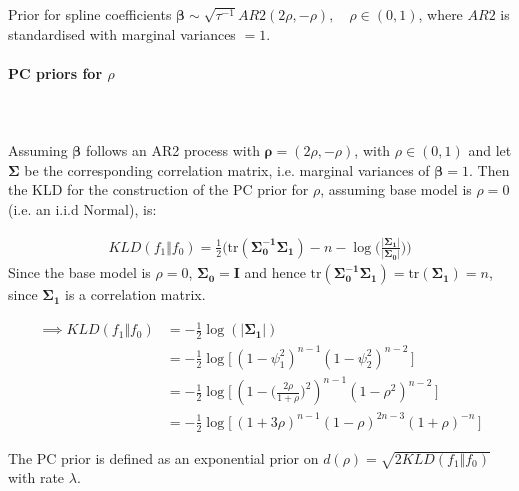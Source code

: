 \documentclass[12pt,a4paper]{article}
\date{\vspace{-5ex}}
\begin{document}
Prior for spline coefficients $\boldsymbol{\beta} \sim \sqrt{\tau^{-1}} AR2(2\rho, -\rho), \quad \rho \in (0, 1)$, where $AR2$ is standardised with marginal variances $= 1.$

\paragraph{PC priors for $\rho$} \\~\\

Assuming $\boldsymbol{\beta}$ follows an AR2 process with $\boldsymbol{\rho} = (2\rho, -\rho)$, with $\rho \in (0, 1)$ and let $\boldsymbol{\Sigma}$ be the corresponding correlation matrix, i.e. marginal variances of $\boldsymbol{\beta} = 1$. Then the KLD for the construction of the PC prior for $\rho$, assuming base model is $\rho = 0$ (i.e. an i.i.d Normal), is:

\begin{align*}
KLD(f_1 \Vert f_0) = \frac{1}{2} \Bigg( \text{tr}(\boldsymbol{\Sigma_0^{-1} \Sigma_1}) - n - \log \Big( \frac{\vert  \boldsymbol{\Sigma_1} \vert}{\vert \boldsymbol{\Sigma_0} \vert} \Big) \Bigg)
\end{align*}
Since the base model is $\rho = 0$, $\boldsymbol{\Sigma_0} = \boldsymbol{I}$ and hence $\text{tr}(\boldsymbol{\Sigma_0^{-1}\Sigma_1}) = \text{tr}(\boldsymbol{\Sigma_1}) = n$, since $\boldsymbol{\Sigma_1}$ is a correlation matrix.

\begin{align*}
\implies KLD(f_1 \Vert f_0) &= -\frac{1}{2} \log(\vert \boldsymbol{\Sigma_1} \vert) \\
&= -\frac{1}{2} \log \big[ \, (1-\psi_1^2)^{n-1} (1-\psi_2^2)^{n-2} \, \big] \\
&= -\frac{1}{2} \log \big[ \, (1- \big(\frac{2\rho}{1+\rho}\big)^2 )^{n-1} (1-\rho^2)^{n-2}\, \big] \\
&= -\frac{1}{2} \log \big[\, (1+3\rho)^{n-1} (1-\rho)^{2n-3} (1+\rho)^{-n}  \, \big]
\end{align*}


The PC prior is defined as an exponential prior on $d(\rho) = \sqrt{2 KLD(f_1 \Vert f_0)}$ with rate $\lambda$.
\end{document}
